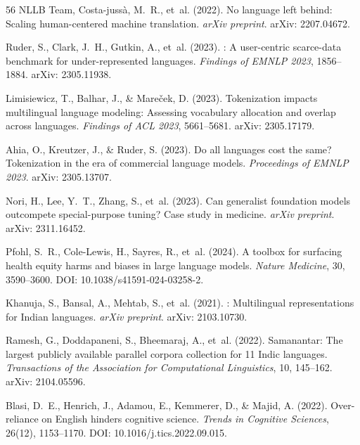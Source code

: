 \documentclass[11pt,a4paper]{article}
\begin{document}
\begin{thebibliography}{56}
{NLLB Team}, Costa-juss\`{a}, M.~R., et~al. (2022).
\newblock No language left behind: Scaling human-centered machine translation.
\newblock \emph{arXiv preprint}.
\newblock arXiv: 2207.04672.

Ruder, S., Clark, J.~H., Gutkin, A., et~al. (2023).
: A user-centric scarce-data benchmark for under-represented languages.
\newblock \emph{Findings of EMNLP 2023}, 1856--1884.
\newblock arXiv: 2305.11938.

Limisiewicz, T., Balhar, J., \& Mare\v{c}ek, D. (2023).
\newblock Tokenization impacts multilingual language modeling: Assessing vocabulary allocation and overlap across languages.
\newblock \emph{Findings of ACL 2023}, 5661--5681.
\newblock arXiv: 2305.17179.

Ahia, O., Kreutzer, J., \& Ruder, S. (2023).
\newblock Do all languages cost the same? Tokenization in the era of commercial language models.
\newblock \emph{Proceedings of EMNLP 2023}.
\newblock arXiv: 2305.13707.

Nori, H., Lee, Y.~T., Zhang, S., et~al. (2023).
\newblock Can generalist foundation models outcompete special-purpose tuning? Case study in medicine.
\newblock \emph{arXiv preprint}.
\newblock arXiv: 2311.16452.

Pfohl, S.~R., Cole-Lewis, H., Sayres, R., et~al. (2024).
\newblock A toolbox for surfacing health equity harms and biases in large language models.
\newblock \emph{Nature Medicine}, 30, 3590--3600.
\newblock DOI: 10.1038/s41591-024-03258-2.

Khanuja, S., Bansal, A., Mehtab, S., et~al. (2021).
: Multilingual representations for {Indian} languages.
\newblock \emph{arXiv preprint}.
\newblock arXiv: 2103.10730.

Ramesh, G., Doddapaneni, S., Bheemaraj, A., et~al. (2022).
\newblock Samanantar: The largest publicly available parallel corpora collection for 11 {Indic} languages.
\newblock \emph{Transactions of the Association for Computational Linguistics}, 10, 145--162.
\newblock arXiv: 2104.05596.

Blasi, D.~E., Henrich, J., Adamou, E., Kemmerer, D., \& Majid, A. (2022).
\newblock Over-reliance on {English} hinders cognitive science.
\newblock \emph{Trends in Cognitive Sciences}, 26(12), 1153--1170.
\newblock DOI: 10.1016/j.tics.2022.09.015.


\end{thebibliography}
\end{document}

